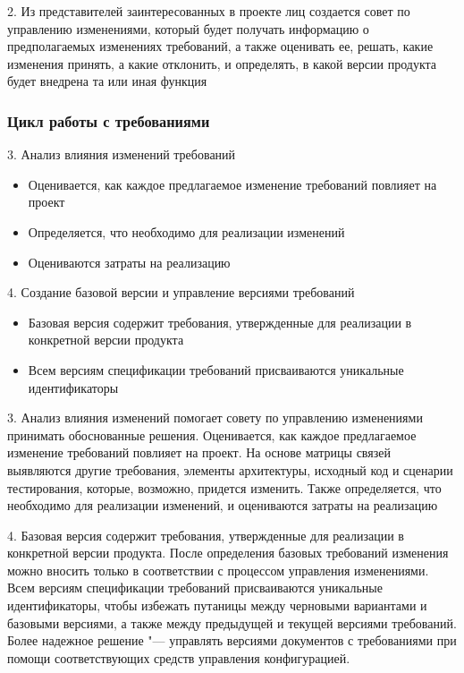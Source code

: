 \documentclass{../industrial-development}
\begin{document}
2. Из представителей заинтересованных в проекте лиц создается совет по управлению изменениями, который будет получать информацию о предполагаемых изменениях требований, а также оценивать ее, решать, какие изменения принять, а какие отклонить, и определять, в какой версии продукта будет внедрена та или иная функция



\begin{frame} \frametitle{Цикл работы с требованиями}
	3. Анализ влияния изменений требований
	\begin{itemize}
\item Оценивается, как каждое предлагаемое изменение требований повлияет на проект
\item Определяется, что необходимо для реализации изменений
\item Оцениваются затраты на реализацию
	\end{itemize} 
	4. Создание базовой версии и управление версиями требований
	\begin{itemize}
\item Базовая версия содержит требования, утвержденные для реализации в конкретной версии продукта 
\item Всем версиям спецификации требований присваиваются уникальные идентификаторы
	\end{itemize}
\end{frame}

\lecturenotes

3. Анализ влияния изменений помогает совету по управлению изменениями принимать обоснованные решения. Оценивается, как каждое предлагаемое изменение требований повлияет на проект. На основе матрицы связей выявляются другие требования, элементы архитектуры, исходный код и сценарии тестирования, которые, возможно, придется изменить. Также определяется, что необходимо для реализации изменений, и оцениваются затраты на реализацию

4. Базовая версия содержит требования, утвержденные для реализации в конкретной версии продукта. После определения базовых требований изменения можно вносить только в соответствии с процессом управления изменениями. Всем версиям спецификации требований присваиваются уникальные идентификаторы, чтобы избежать путаницы между черновыми вариантами и базовыми версиями, а также между предыдущей и текущей версиями требований. Более надежное решение "--- управлять версиями документов с требованиями при помощи соответствующих средств управления конфигурацией.
\end{document}
